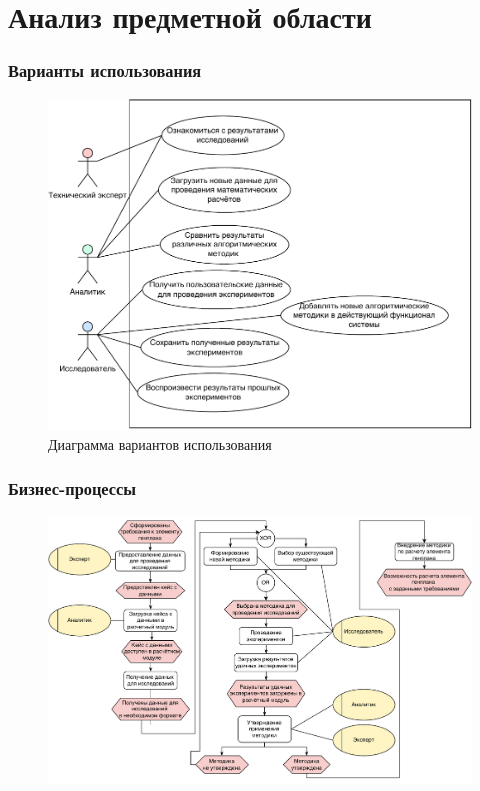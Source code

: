\section{Анализ предметной области}

\begin{frame}
\frametitle{Варианты использования}
\begin{figure}
    \includegraphics[scale=.48]{pictures/analysis/usecase}
    \caption{Диаграмма вариантов использования}
\end{figure}
\end{frame}

\begin{frame}
\frametitle{Бизнес-процессы}
\begin{figure}
    \includegraphics[scale=.48]{pictures/analysis/common_epc}
\end{figure}
\end{frame}


